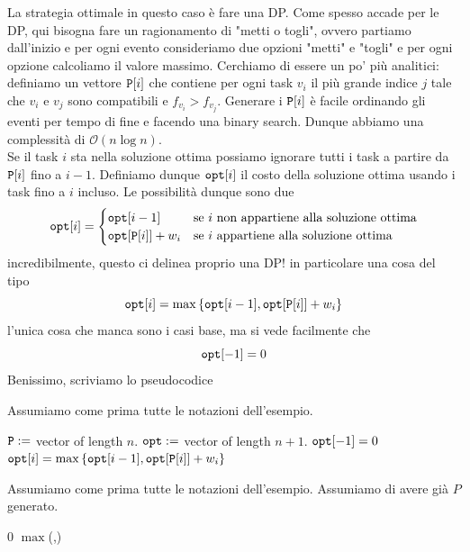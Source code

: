 \documentclass[11pt]{scrartcl}
\newcommand{\bigo}{\mathcal{O}}
\begin{document}
	La strategia ottimale in questo caso è fare una DP. Come spesso accade per le DP, qui bisogna fare un ragionamento di "metti o togli", ovvero partiamo dall'inizio e per ogni evento consideriamo due opzioni "metti" e "togli" e per ogni opzione calcoliamo il valore massimo. Cerchiamo di essere un po' più analitici: definiamo un vettore $\verb*|P|[i]$ che contiene per ogni task $v_i$ il più grande indice $j$ tale che $v_i$ e $v_j$ sono compatibili e $f_{v_i}>f_{v_j}$. Generare i $\verb*|P|[i]$ è facile ordinando gli eventi per tempo di fine e facendo una binary search. Dunque abbiamo una complessità di $\bigo(n\log n)$. \\
	Se il task $i$ sta nella soluzione ottima possiamo ignorare tutti i task a partire da $\verb*|P|[i]$ fino a $i-1$. Definiamo dunque $\verb*|opt|[i]$ il costo della soluzione ottima usando i task fino a $i$ incluso. Le possibilità dunque sono due
	$$\verb*|opt|[i]=
	\begin{cases}
		\verb*|opt|[i-1] & \text{se $i$ non appartiene alla soluzione ottima} \\
		\verb*|opt|[\verb*|P|[i]]+w_i & \text{se $i$ appartiene alla soluzione ottima}
	\end{cases}
	$$
	incredibilmente, questo ci delinea proprio una DP! in particolare una cosa del tipo
	$$\verb*|opt|[i]=\max\left\{\verb*|opt|[i-1],\verb*|opt|[\verb*|P|[i]]+w_i\right\}$$
	l'unica cosa che manca sono i casi base, ma si vede facilmente che 
	$$\verb*|opt|[-1]=0$$
	Benissimo, scriviamo lo pseudocodice
	\begin{algorithm}
		Assumiamo come prima tutte le notazioni dell'esempio.
		\begin{algorithmic}[1]
				\State $\verb|P|:=$ vector of length $n$.
				\State $\verb*|opt|:=$ vector of length $n+1$.
				\State $\verb*|opt|[-1]=0$
				\State {} 
					\State $\verb*|opt|[i]=\max\left\{\verb*|opt|[i-1],\verb*|opt|[\verb*|P|[i]]+w_i\right\}$
				\EndFor
			\EndFunction
		\end{algorithmic}
	\end{algorithm}
	\begin{algorithm}
		Assumiamo come prima tutte le notazioni dell'esempio. Assumiamo di avere già $P$ generato.
		\begin{algorithmic}
				\Return $0$
			\EndIf
			\State \Return $\max$(,)
			\EndFunction
		\end{algorithmic}
	\end{algorithm}
	
\end{document}
